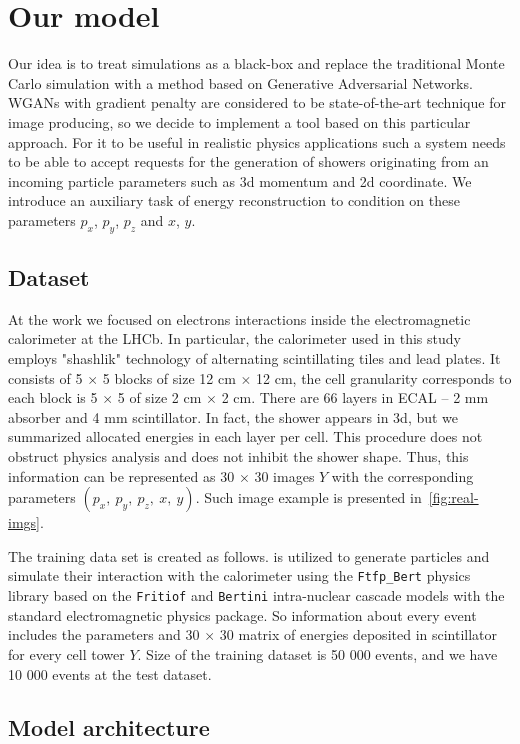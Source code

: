 
\section{Our model} \label{sec:model}
Our idea is to treat simulations as a black-box and replace the traditional Monte Carlo simulation with a method based on Generative Adversarial Networks. WGANs with gradient penalty are considered to be state-of-the-art technique for image producing, so we decide to implement a tool based on this particular approach. For it to be useful in realistic physics applications such a system needs to be able to accept requests for the generation of showers originating from an incoming particle parameters such as 3d momentum and 2d coordinate. We introduce an auxiliary task of energy reconstruction to condition on these parameters $p_x$, $p_y$, $p_z$ and $x$, $y$.

\subsection{Dataset}
At the work we focused on electrons interactions inside the electromagnetic calorimeter at the LHCb. In particular, the calorimeter used in this study employs "shashlik" technology of alternating scintillating tiles and lead plates. It consists of 5 $\times$ 5 blocks of size 12 cm $\times$ 12 cm, the cell granularity corresponds to each block is 5 $\times$ 5 of size 2 cm $\times$ 2 cm. There are 66 layers in ECAL -- 2 mm absorber and 4 mm scintillator. In fact, the shower appears in 3d, but we summarized allocated energies in each layer per cell. This procedure does not obstruct physics analysis and does not inhibit the shower shape. Thus, this information can be represented as 30 $\times$ 30 images $Y$ with the corresponding parameters $(p_x,~ p_y,~ p_z,~ x,~ y)$. Such image example is presented in~\cref{fig:real-imgs}.

The training data set is created as follows. \geant is utilized to generate particles and simulate their interaction with the calorimeter using the \texttt{Ftfp\_Bert} physics library based on the \texttt{Fritiof}  and \texttt{Bertini} intra-nuclear cascade models with the standard electromagnetic physics package. So information about every event includes the parameters and 30 $\times$ 30 matrix of energies deposited in scintillator for every cell tower $Y$. Size of the training dataset is 50 000 events, and we have 10 000 events at the test dataset.

\subsection{Model architecture}

